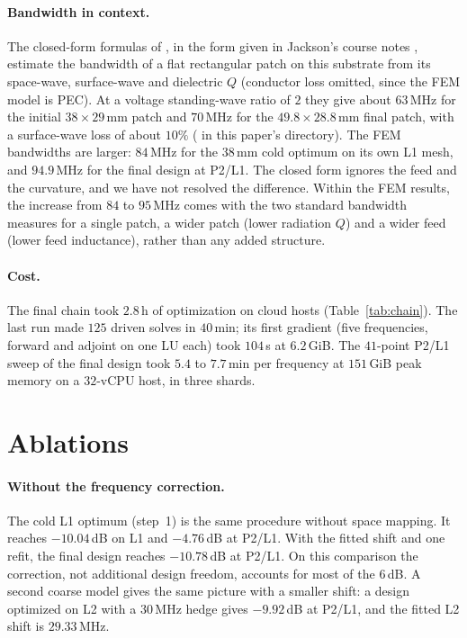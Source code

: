 \documentclass{anvil-paper}
\newcommand{\PL}{P2/L1}
\begin{document}
\paragraph{Bandwidth in context.}
The closed-form formulas of \citet{jackson1991simple}, in the form given
in Jackson's course notes \citep{jackson_ece6345}, estimate the bandwidth of
a flat rectangular patch on this substrate from its space-wave,
surface-wave and dielectric $Q$ (conductor loss omitted, since the FEM model
is PEC). At a voltage standing-wave ratio of $2$ they give about $63$\,MHz
for the initial $38\times29$\,mm patch and $70$\,MHz for the
$49.8\times28.8$\,mm final patch, with a surface-wave loss of about
$10\%$ ( in this paper's directory). The
FEM bandwidths are larger: $84$\,MHz for the $38$\,mm cold optimum on its
own L1 mesh, and $94.9$\,MHz for the final design at \PL. The closed form
ignores the feed and the curvature, and we have not resolved the
difference. Within the FEM results, the increase from $84$ to $95$\,MHz
comes with the two standard bandwidth measures for a single patch, a
wider patch (lower radiation $Q$) and a wider feed (lower feed
inductance), rather than any added structure.

\paragraph{Cost.}
The final chain took $2.8$\,h of optimization on cloud hosts
(Table~\ref{tab:chain}). The last run made $125$ driven solves in
$40$\,min; its first gradient (five frequencies, forward and adjoint on one
LU each) took $104$\,s at $6.2$\,GiB. The $41$-point \PL{} sweep of the
final design took $5.4$ to $7.7$\,min per frequency at $151$\,GiB peak
memory on a $32$-vCPU host, in three shards.

\section{Ablations}
\label{sec:ablations}

\paragraph{Without the frequency correction.}
The cold L1 optimum (step~1) is the same procedure without space mapping.
It reaches $-10.04$\,dB on L1 and $-4.76$\,dB at \PL. With the fitted shift
and one refit, the final design reaches $-10.78$\,dB at \PL. On this
comparison the correction, not additional design freedom, accounts for
most of the $6$\,dB. A second coarse model gives the same picture with a
smaller shift: a design optimized on L2 with a $30$\,MHz hedge gives
$-9.92$\,dB at \PL, and the fitted L2 shift is $29.33$\,MHz.
\end{document}
